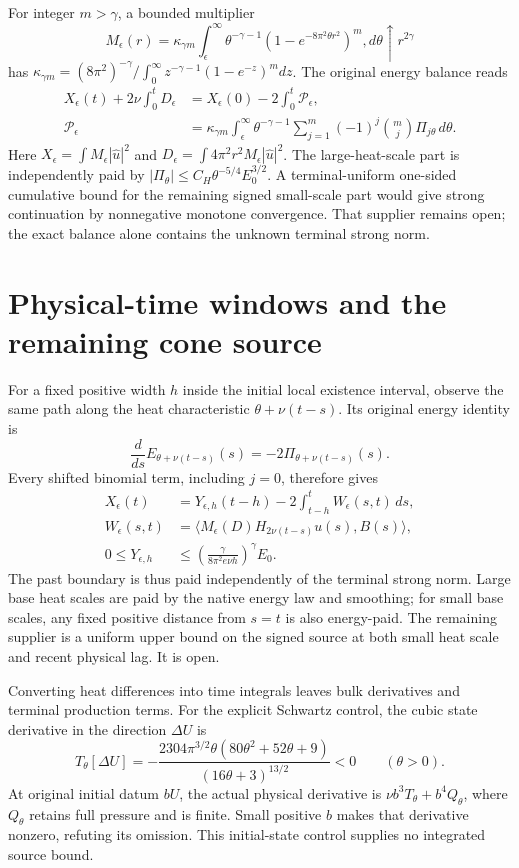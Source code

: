 \documentclass[11pt]{article}
\begin{document}
For integer $m>\gamma$, a bounded multiplier
\[
M_\epsilon(r)=\kappa_{\gamma m}\int_\epsilon^\infty
 \theta^{-\gamma-1}(1-e^{-8\pi^2\theta r^2})^m,d\theta
 \uparrow r^{2\gamma}
\]
has $\kappa_{\gamma m}=(8\pi^2)^{-\gamma}/
\int_0^\infty z^{-\gamma-1}(1-e^{-z})^m dz$.
The original energy balance reads
\[
\begin{split}
X_\epsilon(t)+2\nu\int_0^tD_\epsilon
 &=X_\epsilon(0)-2\int_0^t\mathcal P_\epsilon,\\
\mathcal P_\epsilon&=\kappa_{\gamma m}\int_\epsilon^\infty
 \theta^{-\gamma-1}\sum_{j=1}^m(-1)^j\binom mj\Pi_{j\theta}\,d\theta.
\end{split}
\]
Here $X_\epsilon=\int M_\epsilon|\widehat u|^2$ and
$D_\epsilon=\int4\pi^2r^2M_\epsilon|\widehat u|^2$.
The large-heat-scale part is independently paid by
$|\Pi_\theta|\le C_H\theta^{-5/4}E_0^{3/2}$.
A terminal-uniform one-sided cumulative bound for the remaining signed
small-scale part would give strong continuation by nonnegative monotone
convergence. That supplier remains open; the exact balance alone contains
the unknown terminal strong norm.

\section{Physical-time windows and the remaining cone source}
For a fixed positive width $h$ inside the initial local existence interval,
observe the same path along the heat characteristic
$\theta+\nu(t-s)$. Its original energy identity is
\[
\frac{d}{ds}E_{\theta+\nu(t-s)}(s)
 =-2\Pi_{\theta+\nu(t-s)}(s).
\]
Every shifted binomial term, including $j=0$, therefore gives
\[
\begin{split}
X_\epsilon(t)&=Y_{\epsilon,h}(t-h)-2\int_{t-h}^tW_\epsilon(s,t)\,ds,\\
W_\epsilon(s,t)&=\langle M_\epsilon(D)H_{2\nu(t-s)}u(s),B(s)\rangle,\\
0\le Y_{\epsilon,h}&\le
 \left(\frac{\gamma}{8\pi^2e\nu h}\right)^\gamma E_0.
\end{split}
\]
The past boundary is thus paid independently of the terminal strong norm.
Large base heat scales are paid by the native energy law and smoothing;
for small base scales, any fixed positive distance from $s=t$ is also
energy-paid. The remaining supplier is a uniform upper bound on the signed
source at both small heat scale and recent physical lag. It is open.

Converting heat differences into time integrals leaves bulk derivatives
and terminal production terms. For the explicit Schwartz
control, the cubic state derivative in the direction $\Delta U$ is
\[
T_\theta[\Delta U]
 =-\frac{2304\pi^{3/2}\theta(80\theta^2+52\theta+9)}
 {(16\theta+3)^{13/2}}<0\qquad(\theta>0).
\]
At original initial datum $bU$, the actual physical derivative is
$\nu b^3T_\theta+b^4Q_\theta$, where $Q_\theta$ retains full pressure
and is finite. Small positive $b$ makes that derivative nonzero, refuting
its omission. This initial-state control supplies no integrated source bound.
\end{document}
